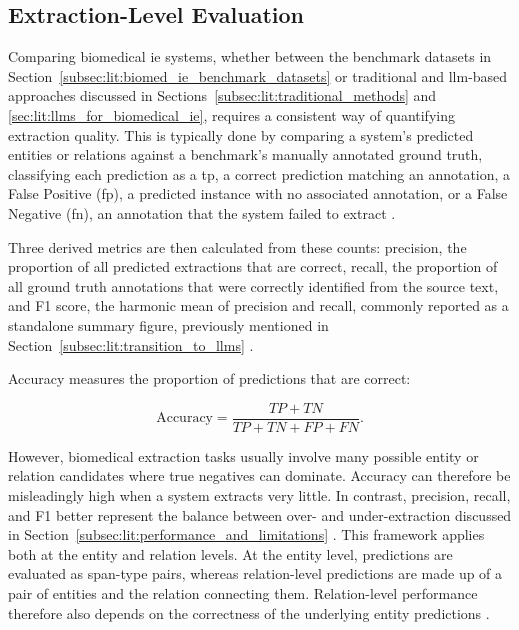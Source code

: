 \subsection{Extraction-Level Evaluation}
\label{subsec:lit:extraction_level_eval}
Comparing biomedical \gls{ie} systems, whether between the benchmark datasets in Section~\ref{subsec:lit:biomed_ie_benchmark_datasets} or traditional and \gls{llm}-based approaches discussed in Sections~\ref{subsec:lit:traditional_methods} and \ref{sec:lit:llms_for_biomedical_ie}, requires a consistent way of quantifying extraction quality. This is typically done by comparing a system's predicted entities or relations against a benchmark's manually annotated ground truth, classifying each prediction as a \gls{tp}, a correct prediction matching an annotation, a False Positive (\gls{fp}), a predicted instance with no associated annotation, or a False Negative (\gls{fn}), an annotation that the system failed to extract \pref.

Three derived metrics are then calculated from these counts: precision, the proportion of all predicted extractions that are correct, recall, the proportion of all ground truth annotations that were correctly identified from the source text, and F1 score, the harmonic mean of precision and recall, commonly reported as a standalone summary figure, previously mentioned in Section~\ref{subsec:lit:transition_to_llms} \pref.

Accuracy measures the proportion of predictions that are correct:
\vspace{0.5em}

\[
\text{Accuracy} = \frac{TP + TN}{TP + TN + FP + FN}.
\]

\vspace{1em}

\noindent However, biomedical extraction tasks usually involve many possible entity or relation candidates where true negatives can dominate. Accuracy can therefore be misleadingly high when a system extracts very little. In contrast, precision, recall, and F1 better represent the balance between over- and under-extraction discussed in Section~\ref{subsec:lit:performance_and_limitations} \pref. This framework applies both at the entity and relation levels. At the entity level, predictions are evaluated as span-type pairs, whereas relation-level predictions are made up of a pair of entities and the relation connecting them. Relation-level performance therefore also depends on the correctness of the underlying entity predictions \pref.

